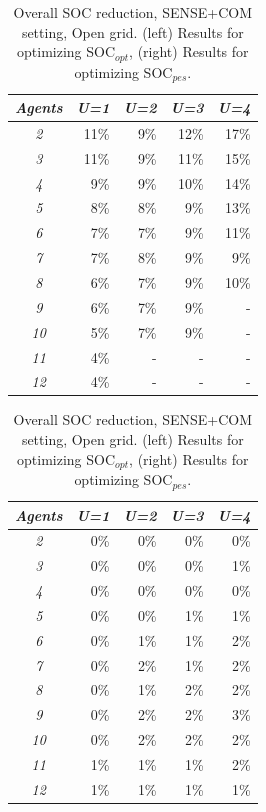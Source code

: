 \documentclass[jair,twoside,11pt,theapa]{article}
\newcommand{\sensecom}{SENSE+COM\xspace}
\newcommand{\socopt}{SOC$_{opt}$\xspace}
\newcommand{\socpes}{SOC$_{pes}$\xspace}
\begin{document}
\begin{table}
\parbox{.5\linewidth}{
\centering
\begin{tabular}{c|rrrr}
 \hline
\textit{Agents} & \multicolumn{1}{c}{\textit{U=1}} & \multicolumn{1}{c}{\textit{U=2}} & \multicolumn{1}{c}{\textit{U=3}} & \multicolumn{1}{c}{\textit{U=4}} \\ \hline
\textit{2} & 11\% & 9\% & 12\% & 17\% \\
\textit{3} & 11\% & 9\% & 11\% & 15\% \\
\textit{4} & 9\% & 9\% & 10\% & 14\% \\
\textit{5} & 8\% & 8\% & 9\% & 13\% \\
\textit{6} & 7\% & 7\% & 9\% & 11\% \\
\textit{7} & 7\% & 8\% & 9\% & 9\% \\
\textit{8} & 6\% & 7\% & 9\% & 10\% \\
\textit{9} & 6\% & 7\% & 9\% & - \\
\textit{10} & 5\% & 7\% & 9\% & - \\
\textit{11} & 4\% & - & - & - \\
\textit{12} & 4\% & - & - & -  \\\hline
\end{tabular}
}
\hfill
\parbox{.5\linewidth}{
\centering
\begin{tabular}{c|rrrr}
 \hline
\textit{Agents} & \multicolumn{1}{c}{\textit{U=1}} & \multicolumn{1}{c}{\textit{U=2}} & \multicolumn{1}{c}{\textit{U=3}} & \multicolumn{1}{c}{\textit{U=4}} \\ \hline
\textit{2} & 0\% & 0\% & 0\% & 0\% \\
\textit{3} & 0\% & 0\% & 0\% & 1\% \\
\textit{4} & 0\% & 0\% & 0\% & 0\% \\
\textit{5} & 0\% & 0\% & 1\% & 1\% \\
\textit{6} & 0\% & 1\% & 1\% & 2\% \\
\textit{7} & 0\% & 2\% & 1\% & 2\% \\
\textit{8} & 0\% & 1\% & 2\% & 2\% \\
\textit{9} & 0\% & 2\% & 2\% & 3\% \\
\textit{10} & 0\% & 2\% & 2\% & 2\% \\
\textit{11} & 1\% & 1\% & 1\% & 2\% \\
\textit{12} & 1\% & 1\% & 1\% & 1\% \\ \hline
\end{tabular}
}
\caption{Overall SOC reduction, \sensecom setting, Open grid. 
(left) Results for optimizing \socopt, (right) Results for optimizing \socpes.}
\label{tab:open_map-percentage-online}
\end{table}
\end{document}

